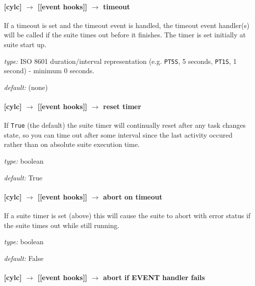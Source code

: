 \paragraph[timeout]{[cylc] $\rightarrow$ [[event hooks]] $\rightarrow$ timeout}

If a timeout is set and the timeout event is handled, the timeout event
handler(s) will be called if the suite times out before it finishes.
The timer is set initially at suite start up.

\begin{myitemize}
    \item {\em type:} ISO 8601 duration/interval representation (e.g.
 \lstinline=PT5S=, 5 seconds, \lstinline=PT1S=, 1 second) - minimum 0 seconds.
    \item {\em default:} (none)
\end{myitemize}

\paragraph[reset timer]{[cylc] $\rightarrow$ [[event hooks]] $\rightarrow$ reset timer}

If \lstinline=True= (the default) the suite timer will continually reset
after any task changes state, so you can time out after some interval
since the last activity occured rather than on absolute suite execution
time.

\begin{myitemize}
    \item {\em type:} boolean
    \item {\em default:} True
\end{myitemize}

\paragraph[abort on timeout]{[cylc] $\rightarrow$ [[event hooks]] $\rightarrow$ abort on timeout}

If a suite timer is set (above) this will cause the suite to abort with
error status if the suite times out while still running.

\begin{myitemize}
    \item {\em type:} boolean
    \item {\em default:} False
\end{myitemize}

\paragraph[abort if startup handler fails]{[cylc] $\rightarrow$ [[event hooks]] $\rightarrow$ abort if EVENT handler fails}

